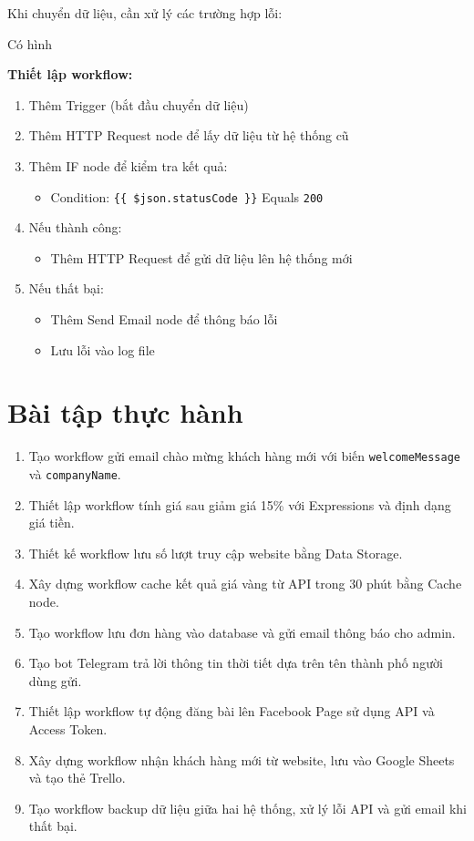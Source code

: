 Khi chuyển dữ liệu, cần xử lý các trường hợp lỗi:

Có hình

\textbf{Thiết lập workflow:}
\begin{enumerate}
    \item Thêm Trigger (bắt đầu chuyển dữ liệu)
    \item Thêm HTTP Request node để lấy dữ liệu từ hệ thống cũ
    \item Thêm IF node để kiểm tra kết quả:
    \begin{itemize}
        \item Condition: \verb|{{ $json.statusCode }}| Equals \verb|200|
    \end{itemize}
    \item Nếu thành công:
    \begin{itemize}
        \item Thêm HTTP Request để gửi dữ liệu lên hệ thống mới
    \end{itemize}
    \item Nếu thất bại:
    \begin{itemize}
        \item Thêm Send Email node để thông báo lỗi
        \item Lưu lỗi vào log file
    \end{itemize}
\end{enumerate}

\newpage
\section{Bài tập thực hành}
\begin{enumerate}
    \item Tạo workflow gửi email chào mừng khách hàng mới với biến \verb|welcomeMessage| và \verb|companyName|.
    \item Thiết lập workflow tính giá sau giảm giá 15\% với Expressions và định dạng giá tiền.
    \item Thiết kế workflow lưu số lượt truy cập website bằng Data Storage.
    \item Xây dựng workflow cache kết quả giá vàng từ API trong 30 phút bằng Cache node.
    \item Tạo workflow lưu đơn hàng vào database và gửi email thông báo cho admin.
    \item Tạo bot Telegram trả lời thông tin thời tiết dựa trên tên thành phố người dùng gửi.
    \item Thiết lập workflow tự động đăng bài lên Facebook Page sử dụng API và Access Token.
    \item Xây dựng workflow nhận khách hàng mới từ website, lưu vào Google Sheets và tạo thẻ Trello.
    \item Tạo workflow backup dữ liệu giữa hai hệ thống, xử lý lỗi API và gửi email khi thất bại.
\end{enumerate}